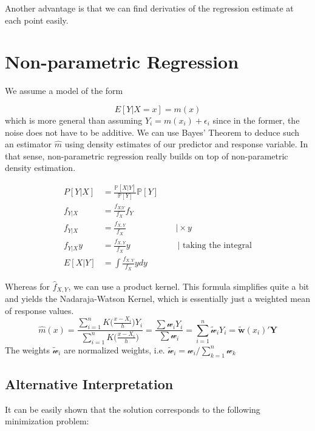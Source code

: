 \documentclass[]{book}
\begin{document}
Another advantage is that we can find derivaties of the regression
estimate at each point easily.

\chapter{Non-parametric Regression}\label{non-parametric-regression}

We assume a model of the form

\[ E[Y|X = x] = m(x)\] which is more general than assuming
\(Y_i = m(x_i) + \epsilon_i\) since in the former, the noise does not
have to be additive. We can use Bayes' Theorem to deduce such an
estimator \(\hat{m}\) using density estimates of our predictor and
response variable. In that sense, non-parametric regression really
builds on top of non-parametric density estimation.

\begin{equation}
\begin{split}
P[Y|X] &=  \frac{\mathbb{P}[X|Y]}{\mathbb{P}[Y]}\mathbb{P}[Y] \\ 
f_{Y|X} & = \frac{f_{X|Y}}{f_X}f_Y \\
f_{Y|X} & = \frac{f_{X, Y}}{f_X}   \;\;\;\;\;\;\;\;\;\;\;\;\;\;\;\;\;\;\;\;\; \text{|} \times y\\
f_{Y|X}y & = \frac{f_{X, Y}}{f_X}y \;\;\;\;\;\;\;\;\;\;\;\;\;\;\;\;\;\;\;\; \text{| taking the integral}\\
E[X|Y] & = \int \frac{f_{X, Y}}{f_X}ydy
\end{split}
\end{equation}

Whereas for \(\hat{f}_{X, Y}\), we can use a product kernel. This
formula simplifies quite a bit and yields the Nadaraja-Watson Kernel,
which is essentially just a weighted mean of response values.
\[\hat{m}(x) = \frac{\sum\limits_{i = 1}^n K\Big(\frac{x-X_i}{h}\Big)Y_i}{\sum\limits_{i = 1}^nK\Big(\frac{x-X_i}{h}\Big)} = \frac{\sum\mathcal{w}_i Y_i}{\sum\mathcal{w}_i} = \sum\limits_{i = 1}^n \tilde{\mathcal{w}}_i Y_i = \tilde{\mathbf{w}}(x_i)'\mathbf{Y}\]
The weights \(\tilde{\mathcal{w}}_i\) are normalized weights, i.e.
\(\tilde{\mathcal{w}}_i = \mathcal{w}_i / \sum\limits_{k = 1}^n \mathcal{w}_k\)

\section{Alternative Interpretation}\label{alternative-interpretation-1}

It can be easily shown that the solution corresponds to the following
minimization problem:
\end{document}
